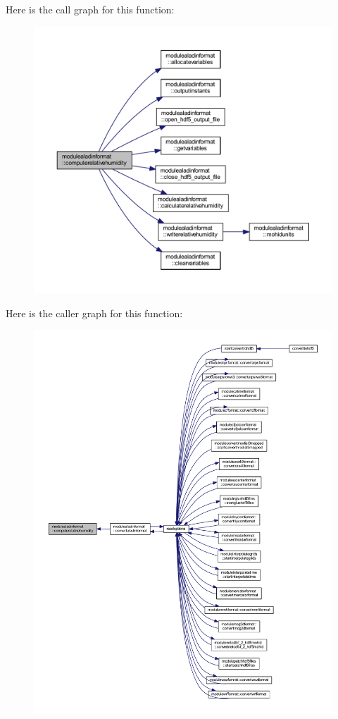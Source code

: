 Here is the call graph for this function\+:\nopagebreak
\begin{figure}[H]
\begin{center}
\leavevmode
\includegraphics[width=350pt]{namespacemodulealadinformat_ae9288daa19c82d5cb2b9c128f3b55cbc_cgraph}
\end{center}
\end{figure}
Here is the caller graph for this function\+:\nopagebreak
\begin{figure}[H]
\begin{center}
\leavevmode
\includegraphics[width=350pt]{namespacemodulealadinformat_ae9288daa19c82d5cb2b9c128f3b55cbc_icgraph}
\end{center}
\end{figure}
